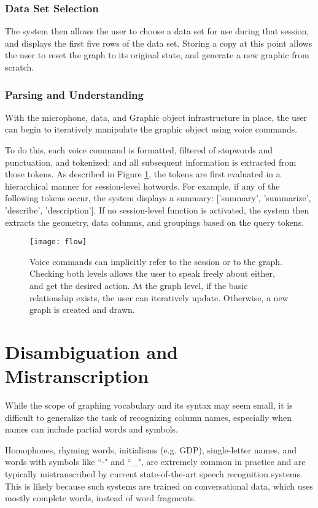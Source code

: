 \documentclass[11pt]{article}
\begin{document}
\subsubsection{Data Set Selection}
The system then allows the user to choose a data set for use during that session, and displays the first five rows of the data set. Storing a copy at this point allows the user to reset the graph to its original state, and generate a new graphic from scratch.

\subsubsection{Parsing and Understanding}
With the microphone, data, and Graphic object infrastructure in place, the user can begin to iteratively manipulate the graphic object using voice commands.

To do this, each voice command is formatted, filtered of stopwords and punctuation, and tokenized; and all subsequent information is extracted from those tokens. As described in Figure \ref{fig:flow}, the tokens are first evaluated in a hierarchical manner for session-level hotwords. For example, if any of the following tokens occur, the system displays a summary: ['summary', 'summarize', 'describe', 'description']. If no session-level function is activated, the system then extracts the geometry, data columns, and groupings based on the query tokens.

\begin{figure}[ht]
\texttt{[image: flow]}
\caption{Voice commands can implicitly refer to the session or to the graph. Checking both levels allows the user to speak freely about either, and get the desired action. At the graph level, if the basic relationship exists, the user can iteratively update. Otherwise, a new graph is created and drawn.}
\label{fig:flow}
\end{figure}

\section{Disambiguation and Mistranscription}
While the scope of graphing vocabulary and its syntax may seem small, it is difficult to generalize the task of recognizing column names, especially when names can include partial words and symbols.

Homophones, rhyming words, initialisms (e.g. GDP), single-letter names, and words with symbols like ``-" and ``\_", are extremely common in practice and are typically mistranscribed by current state-of-the-art speech recognition systems. This is likely because such systems are trained on conversational data, which uses mostly complete words, instead of word fragments. 
\end{document}
